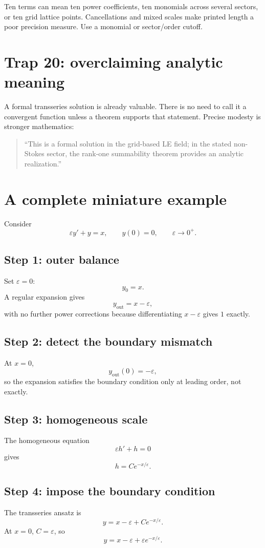 \documentclass[11pt,openany]{book}
\theoremstyle{definition}
\theoremstyle{plain}
\theoremstyle{remark}
\newcommand{\eps}{\varepsilon}
\begin{document}
Ten terms can mean ten power coefficients, ten monomials across several sectors, or ten grid lattice points. Cancellations and mixed scales make printed length a poor precision measure. Use a monomial or sector/order cutoff.

\section{Trap 20: overclaiming analytic meaning}

A formal transseries solution is already valuable. There is no need to call it a convergent function unless a theorem supports that statement. Precise modesty is stronger mathematics:
\begin{quote}
``This is a formal solution in the grid-based LE field; in the stated non-Stokes sector, the rank-one summability theorem provides an analytic realization.''
\end{quote}

\section{A complete miniature example}

Consider
\begin{equation}\label{eq:workflow-example}
 \eps y'+y=x,
 \qquad y(0)=0,
 \qquad \eps\to0^+.
\end{equation}

\subsection*{Step 1: outer balance}
Set $\eps=0$:
\[
 y_0=x.
\]
A regular expansion gives
\[
 y_{\mathrm{out}}=x-\eps,
\]
with no further power corrections because differentiating $x-\eps$ gives $1$ exactly.

\subsection*{Step 2: detect the boundary mismatch}
At $x=0$,
\[
 y_{\mathrm{out}}(0)=-\eps,
\]
so the expansion satisfies the boundary condition only at leading order, not exactly.

\subsection*{Step 3: homogeneous scale}
The homogeneous equation
\[
 \eps h'+h=0
\]
gives
\[
 h=Ce^{-x/\eps}.
\]

\subsection*{Step 4: impose the boundary condition}
The transseries ansatz is
\[
 y=x-\eps+Ce^{-x/\eps}.
\]
At $x=0$, $C=\eps$, so
\begin{equation}\label{eq:workflow-example-solution}
 y=x-\eps+\eps e^{-x/\eps}.
\end{equation}
\end{document}
